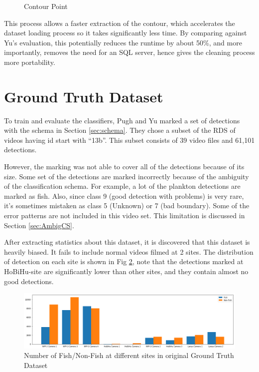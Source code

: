 \documentclass[bsc,logo,twoside,fullspacing,parskip]{infthesis}
\begin{document}
\begin{figure}[!ht]
\begin{minipage}[t]{0.3 \linewidth}
		\caption{\footnotesize Contour Point}
		\label{fig:bbcc3}
	\end{minipage}
\end{figure}

\vspace{-20pt}

This process allows a faster extraction of the contour, which accelerates the dataset loading process so it takes significantly less time. 
By comparing against Yu's\cite{Yu} evaluation, this potentially reduces the runtime by about 50\%, and more importantly, removes the need for an SQL server, hence gives the cleaning process more portability.


\vspace{-10pt}

\section{Ground Truth Dataset}
\label{sec:gt}

\vspace{-10pt}

To train and evaluate the classifiers, Pugh and Yu marked a set of detections with the schema in Section \ref{sec:schema}. 
They chose a subset of the RDS of videos having id start with ``13b''. This subset consists of 39 video files and 61,101 detections. 

However, the marking was not able to cover all of the detections because of its size. 
Some set of the detections are marked incorrectly because of the ambiguity of the classification schema. 
For example, a lot of the plankton detections are marked as fish. 
Also, since class 9 (good detection with problems) is very rare, it's sometimes mistaken as class 5 (Unknown) or 7 (bad boundary). Some of the error patterns are not included in this video set. This limitation is discussed in Section \ref{sec:AmbigCS}.

After extracting statistics about this dataset, it is discovered that this dataset is heavily biased. 
It fails to include normal videos filmed at 2 sites. The distribution of detection on each site is shown in Fig \ref{fig:gtdist}, note that the detections marked at HoBiHu-site are significantly lower than other sites, and they contain almost no good detections.

\vspace{-5pt}

\begin{figure}[h]
    \centering
    \includegraphics[scale=0.34]{graph/classdist.png}
    \caption{Number of Fish/Non-Fish at different sites in original Ground Truth Dataset}
    \label{fig:gtdist}
\end{figure}
\end{document}
